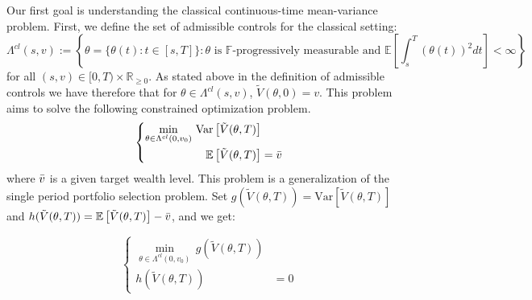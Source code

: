 \documentclass[oneside, a4paper, onecolumn, 11pt]{article}
\begin{document}
Our first goal is understanding the classical continuous-time mean-variance problem.
First, we define the set of admissible controls for the classical setting:
\begin{equation*}
    \Lambda^{cl}(s,v) := \left\{ \theta = \{\theta(t) \colon t \in [s,T]\} \colon \theta \text{ is } \mathbb{F} \text{-progressively measurable and } \mathbb{E}\left[ \int_{s}^{T} (\theta(t))^2dt \right] < \infty \right\}
\end{equation*}  
for all $(s,v) \in [0,T) \times \mathbb{R}_{\geq 0}$. As stated above in the definition of admissible controls we have therefore that for $\theta \in \Lambda^{cl}(s,v) $, $\tilde{V}(\theta,0) = v$. 
This problem aims to solve the following constrained optimization problem. 
\begin{equation}
\left\{
\begin{aligned}
\min_{\theta \in \Lambda^{cl}(0,v_0)} \, \text{Var}\left[\tilde{V}(\theta,T) \right] & \\
\mathbb{E}\left[\tilde{V}(\theta,T) \right] &= \Bar{v}
\end{aligned}
\right.
\end{equation}
where \( \Bar{v} \) is a given target wealth level. This problem is a generalization of the single period portfolio selection problem.
Set \( g( \tilde{V}(\theta,T)) =  \text{Var}\left[ \tilde{V}(\theta,T)\right] \) and \( h( \tilde{V}(\theta,T)) = \mathbb{E}\left[ \tilde{V}(\theta,T)\right] - \Bar{v} \), and we get: 

\[
\left\{
\begin{aligned}
\min_{\theta \in \Lambda^{cl}(0,v_0)} \, g( \tilde{V}(\theta,T))  \\
h( \tilde{V}(\theta,T)) &= 0
\end{aligned}
\right.
\]
\end{document}
